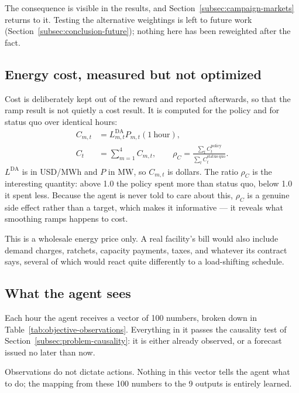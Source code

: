 ﻿\documentclass[12pt]{article}
\begin{document}
The consequence is visible in the results, and
Section~\ref{subsec:campaign-markets} returns to it. Testing the alternative
weightings is left to future work
(Section~\ref{subsec:conclusion-future}); nothing here has been reweighted after
the fact.

\subsection{Energy cost, measured but not optimized}
\label{subsec:objective-energy-cost}

Cost is deliberately kept out of the reward and reported afterwards, so that the
ramp result is not quietly a cost result. It is computed for the policy and for
status quo over identical hours:
\begin{align}
  C_{m,t}&=L^{\mathrm{DA}}_{m,t}P_{m,t}(1\ \mathrm{hour}), \\
  C_t&=\sum_{m=1}^{4}C_{m,t}, \qquad
  \rho_C=\frac{\sum_t C_t^{\mathrm{policy}}}
                 {\sum_t C_t^{\mathrm{status\ quo}}}.
  \label{eq:energy-cost}
\end{align}
\(L^{\mathrm{DA}}\) is in USD/MWh and \(P\) in MW, so \(C_{m,t}\) is dollars.
The ratio \(\rho_C\) is the interesting quantity: above 1.0 the policy spent
more than status quo, below 1.0 it spent less. Because the agent is never told
to care about this, \(\rho_C\) is a genuine side effect rather than a target,
which makes it informative --- it reveals what smoothing ramps happens to cost.

This is a wholesale energy price only. A real facility's bill would also include
demand charges, ratchets, capacity payments, taxes, and whatever its contract
says, several of which would react quite differently to a load-shifting
schedule.

\subsection{What the agent sees}
\label{subsec:objective-observations}

Each hour the agent receives a vector of 100 numbers, broken down in
Table~\ref{tab:objective-observations}. Everything in it passes the causality
test of Section~\ref{subsec:problem-causality}: it is either already observed,
or a forecast issued no later than now.

Observations do not dictate actions. Nothing in this vector tells the agent what
to do; the mapping from these 100 numbers to the 9 outputs is entirely learned.
\end{document}
